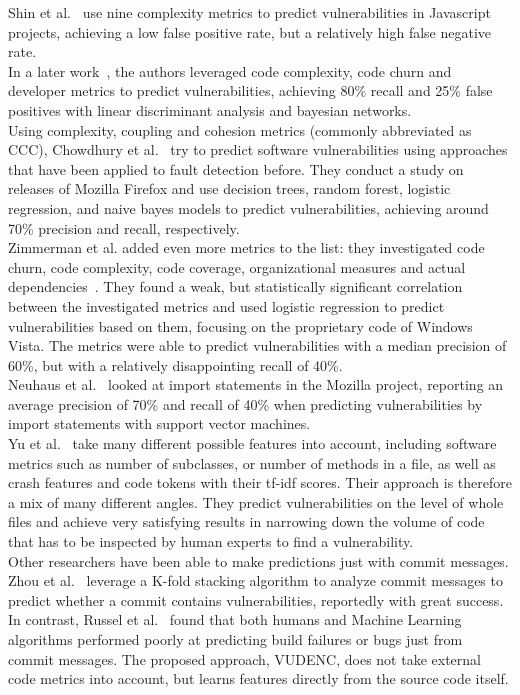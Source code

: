 \documentclass[
a4paper,
pagesize,
pdftex,
12pt,
twoside, %
BCOR=5mm, %
ngerman,
fleqn,
final,
]{scrartcl}
\begin{document}
	Shin et al.~\cite{Shin.2008} use nine complexity metrics to predict vulnerabilities in Javascript projects, achieving a low false positive rate, but a relatively high false negative rate.\\
	In a later work~\cite{Shin.2010}, the authors leveraged code complexity, code churn and developer metrics to predict vulnerabilities, achieving 80\% recall and 25\% false positives with linear discriminant analysis and bayesian networks. \\
	Using complexity, coupling and cohesion metrics (commonly abbreviated as CCC), Chowdhury et al.~\cite{Chowdhury.2011} try to predict software vulnerabilities using approaches that have been applied to fault detection before. They conduct a study on releases of Mozilla Firefox and use decision trees, random forest, logistic regression, and naive bayes models to predict vulnerabilities, achieving around 70\% precision and recall, respectively. \\
	Zimmerman et al. added even more metrics to the list: they investigated code churn, code complexity, code coverage, organizational measures and actual dependencies~\cite{Zimmermann.2010}. They found a weak, but statistically significant correlation between the investigated metrics and used logistic regression to predict vulnerabilities based on them, focusing on the proprietary code of Windows Vista. The metrics were able to predict vulnerabilities with a median precision of 60\%, but with a relatively disappointing recall of 40\%. \\
	Neuhaus et al.~\cite{Neuhaus.2007} looked at import statements in the Mozilla project, reporting an average precision of 70\% and recall of 40\% when predicting vulnerabilities by import statements with support vector machines. \\
	Yu et al.~\cite{Yu.2019} take many different possible features into account, including software metrics such as number of subclasses, or number of methods in a file, as well as crash features and code tokens with their tf-idf scores. Their approach is therefore a mix of many different angles. They predict vulnerabilities on the level of whole files and achieve very satisfying results in narrowing down the volume of code that has to be inspected by human experts to find a vulnerability.\\
	Other researchers have been able to make predictions just with commit messages. Zhou et al.~\cite{Zhou.2017} leverage a K-fold stacking algorithm to analyze commit messages to predict whether a commit contains vulnerabilities, reportedly with great success. In contrast, Russel et al.~\cite{Russell.2018} found that both humans and Machine Learning algorithms performed poorly at predicting build failures or bugs just from commit messages.
	The proposed approach, VUDENC, does not take external code metrics into account, but learns features directly from the source code itself. 
	
\end{document}
